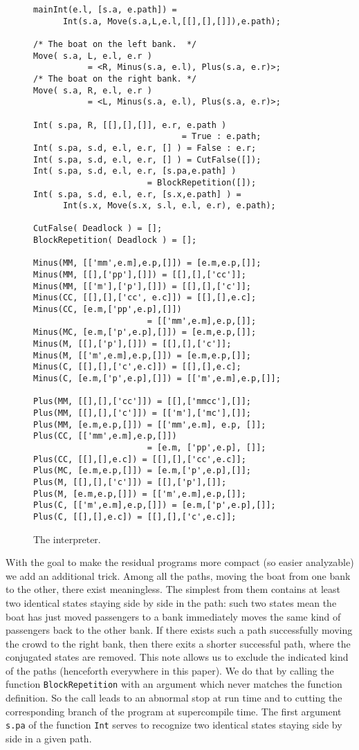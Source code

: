 \documentclass[preprint]{sigplanconf}
\begin{document}
\begin{figure}
\begin{verbatim}
mainInt(e.l, [s.a, e.path]) = 
      Int(s.a, Move(s.a,L,e.l,[[],[],[]]),e.path);

/* The boat on the left bank.  */
Move( s.a, L, e.l, e.r ) 
           = <R, Minus(s.a, e.l), Plus(s.a, e.r)>;
/* The boat on the right bank. */
Move( s.a, R, e.l, e.r ) 
           = <L, Minus(s.a, e.l), Plus(s.a, e.r)>;

Int( s.pa, R, [[],[],[]], e.r, e.path ) 
                              = True : e.path;
Int( s.pa, s.d, e.l, e.r, [] ) = False : e.r;
Int( s.pa, s.d, e.l, e.r, [] ) = CutFalse([]);
Int( s.pa, s.d, e.l, e.r, [s.pa,e.path] ) 
                       = BlockRepetition([]);
Int( s.pa, s.d, e.l, e.r, [s.x,e.path] ) = 
      Int(s.x, Move(s.x, s.l, e.l, e.r), e.path);

CutFalse( Deadlock ) = [];
BlockRepetition( Deadlock ) = [];

Minus(MM, [['mm',e.m],e.p,[]]) = [e.m,e.p,[]];
Minus(MM, [[],['pp'],[]]) = [[],[],['cc']];
Minus(MM, [['m'],['p'],[]]) = [[],[],['c']];
Minus(CC, [[],[],['cc', e.c]]) = [[],[],e.c];
Minus(CC, [e.m,['pp',e.p],[]]) 
                       = [['mm',e.m],e.p,[]];
Minus(MC, [e.m,['p',e.p],[]]) = [e.m,e.p,[]];
Minus(M, [[],['p'],[]]) = [[],[],['c']];
Minus(M, [['m',e.m],e.p,[]]) = [e.m,e.p,[]];
Minus(C, [[],[],['c',e.c]]) = [[],[],e.c];
Minus(C, [e.m,['p',e.p],[]]) = [['m',e.m],e.p,[]];

Plus(MM, [[],[],['cc']]) = [[],['mmcc'],[]];
Plus(MM, [[],[],['c']]) = [['m'],['mc'],[]];
Plus(MM, [e.m,e.p,[]]) = [['mm',e.m], e.p, []];
Plus(CC, [['mm',e.m],e.p,[]]) 
                       = [e.m, ['pp',e.p], []];
Plus(CC, [[],[],e.c]) = [[],[],['cc',e.c]];
Plus(MC, [e.m,e.p,[]]) = [e.m,['p',e.p],[]];
Plus(M, [[],[],['c']]) = [[],['p'],[]];
Plus(M, [e.m,e.p,[]]) = [['m',e.m],e.p,[]];
Plus(C, [['m',e.m],e.p,[]]) = [e.m,['p',e.p],[]];
Plus(C, [[],[],e.c]) = [[],[],['c',e.c]];
\end{verbatim}
\caption{The interpreter.}
\label{fig:Interpreter}
\end{figure}


With the goal to make the residual programs more compact (so easier analyzable) we add an additional trick. Among all the paths, moving the boat from one bank to the other, there exist meaningless. 
The simplest from them contains at least two identical states staying side by side in the path: such two states mean the boat has just moved passengers to a bank immediately moves the same kind of passengers back to the other bank. If there exists such a path successfully moving the crowd to the right bank, then there exits a shorter successful path, where the conjugated states are removed. 
This note allows us 
to 
exclude the indicated kind of the paths (henceforth everywhere in this paper).  We do that by calling the function \texttt{BlockRepetition} with an argument which never matches the function definition. So the call leads to an abnormal stop at run time and to cutting the corresponding branch of the program at supercompile time. The first argument \texttt{s.pa} of the function \texttt{Int} serves to recognize two identical states staying side by side in a given path.
\end{document}
